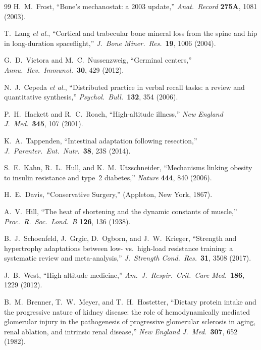 \documentclass[aps,pre,twocolumn,superscriptaddress,floatfix]{revtex4-2}
\begin{document}
\begin{thebibliography}{99}
H.~M.~Frost, ``Bone's mechanostat: a 2003 update,''
\emph{Anat.\ Record} \textbf{275A}, 1081 (2003).

T.~Lang \emph{et al.}, ``Cortical and trabecular bone
mineral loss from the spine and hip in long-duration
spaceflight,'' \emph{J.\ Bone Miner.\ Res.}\ \textbf{19},
1006 (2004).

G.~D.~Victora and M.~C.~Nussenzweig, ``Germinal centers,''
\emph{Annu.\ Rev.\ Immunol.}\ \textbf{30}, 429 (2012).

N.~J.~Cepeda \emph{et al.}, ``Distributed practice in
verbal recall tasks: a review and quantitative synthesis,''
\emph{Psychol.\ Bull.}\ \textbf{132}, 354 (2006).

P.~H.~Hackett and R.~C.~Roach, ``High-altitude illness,''
\emph{New England J.\ Med.}\ \textbf{345}, 107 (2001).

K.~A.~Tappenden, ``Intestinal adaptation following resection,''
\emph{J.\ Parenter.\ Ent.\ Nutr.}\ \textbf{38}, 23S (2014).

S.~E.~Kahn, R.~L.~Hull, and K.~M.~Utzschneider,
``Mechanisms linking obesity to insulin resistance
and type~2 diabetes,''
\emph{Nature} \textbf{444}, 840 (2006).

H.~E.~Davis,
``Conservative Surgery,''
(Appleton, New York, 1867).

A.~V.~Hill,
``The heat of shortening and the dynamic constants
of muscle,''
\emph{Proc.\ R.\ Soc.\ Lond.\ B} \textbf{126}, 136 (1938).

B.~J.~Schoenfeld, J.~Grgic, D.~Ogborn, and
J.~W.~Krieger,
``Strength and hypertrophy adaptations between
low- vs.\ high-load resistance training: a systematic
review and meta-analysis,''
\emph{J.\ Strength Cond.\ Res.}\ \textbf{31}, 3508 (2017).

J.~B.~West,
``High-altitude medicine,''
\emph{Am.\ J.\ Respir.\ Crit.\ Care Med.}\
\textbf{186}, 1229 (2012).

B.~M.~Brenner, T.~W.~Meyer, and T.~H.~Hostetter,
``Dietary protein intake and the progressive nature of
kidney disease: the role of hemodynamically mediated
glomerular injury in the pathogenesis of progressive
glomerular sclerosis in aging, renal ablation, and
intrinsic renal disease,''
\emph{New England J.\ Med.}\ \textbf{307}, 652 (1982).


\end{thebibliography}
\end{document}
